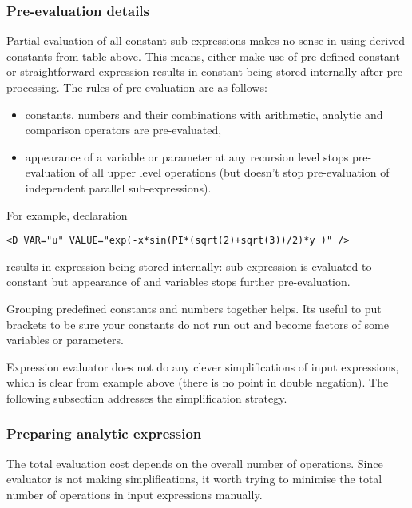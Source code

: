 \subsubsection{Pre-evaluation details}
Partial evaluation of all constant sub-expressions makes no sense in using
derived constants from table above. This means, either make use of pre-defined
constant  or straightforward expression 
results in constant  being stored internally after
pre-processing. The rules of pre-evaluation are as follows:
\begin{itemize}
\item constants, numbers and their combinations with arithmetic, analytic and
 comparison operators are pre-evaluated,
\item appearance of a variable or parameter
 at any recursion level stops pre-evaluation of all upper level operations (but
 doesn't stop pre-evaluation of independent parallel sub-expressions).
\end{itemize}

For example, declaration 
\begin{lstlisting}[style=XMLStyle]
     <D VAR="u" VALUE="exp(-x*sin(PI*(sqrt(2)+sqrt(3))/2)*y )" />
\end{lstlisting}
results in expression  being
stored internally: sub-expression  is
evaluated to constant but appearance of  and  variables
stops further pre-evaluation.

Grouping predefined constants and numbers together helps. Its useful to put
brackets to be sure your constants do not run out and become factors of some
variables or parameters.

Expression evaluator does not do any clever simplifications of input
expressions, which is clear from example above (there is no point in double
negation). The following subsection addresses the simplification strategy.

\subsubsection{Preparing analytic expression}

The total evaluation cost depends on the overall number of operations. Since
evaluator is not making simplifications, it worth trying to minimise the total
number of operations in input expressions manually.

